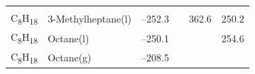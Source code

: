 \documentclass[
]{book}
\theoremstyle{definition}
\theoremstyle{definition}
\theoremstyle{definition}
\theoremstyle{remark}
\begin{document}
\begin{longtable}[]{@{}llllll@{}}
\begin{minipage}[t]{0.14\columnwidth}
\strut
\end{minipage}\tabularnewline
\begin{minipage}[t]{0.07\columnwidth}\raggedright
C\textsubscript{8}H\textsubscript{18}\strut
\end{minipage} & \begin{minipage}[t]{0.17\columnwidth}\raggedright
3-Methylheptane(l)\strut
\end{minipage} & \begin{minipage}[t]{0.15\columnwidth}\raggedright
--252.3\strut
\end{minipage} & \begin{minipage}[t]{0.15\columnwidth}\raggedright
\strut
\end{minipage} & \begin{minipage}[t]{0.14\columnwidth}\raggedright
362.6\strut
\end{minipage} & \begin{minipage}[t]{0.14\columnwidth}\raggedright
250.2\strut
\end{minipage}\tabularnewline
\begin{minipage}[t]{0.07\columnwidth}\raggedright
C\textsubscript{8}H\textsubscript{18}\strut
\end{minipage} & \begin{minipage}[t]{0.17\columnwidth}\raggedright
Octane(l)\strut
\end{minipage} & \begin{minipage}[t]{0.15\columnwidth}\raggedright
--250.1\strut
\end{minipage} & \begin{minipage}[t]{0.15\columnwidth}\raggedright
\strut
\end{minipage} & \begin{minipage}[t]{0.14\columnwidth}\raggedright
\strut
\end{minipage} & \begin{minipage}[t]{0.14\columnwidth}\raggedright
254.6\strut
\end{minipage}\tabularnewline
\begin{minipage}[t]{0.07\columnwidth}\raggedright
C\textsubscript{8}H\textsubscript{18}\strut
\end{minipage} & \begin{minipage}[t]{0.17\columnwidth}\raggedright
Octane(g)\strut
\end{minipage} & \begin{minipage}[t]{0.15\columnwidth}\raggedright
--208.5\strut
\end{minipage} & \begin{minipage}[t]{0.15\columnwidth}\raggedright

\end{minipage}
\end{longtable}
\end{document}
